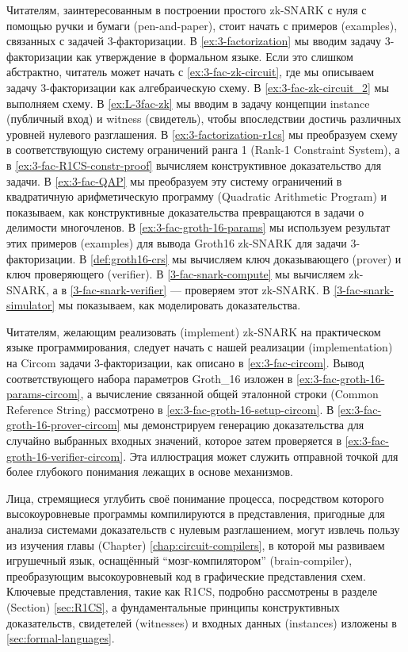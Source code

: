 Читателям, заинтересованным в построении простого zk-SNARK с нуля с помощью ручки и бумаги (pen-and-paper), стоит начать с примеров (examples), связанных с задачей 3-факторизации. В \examplename{} \ref{ex:3-factorization} мы вводим задачу 3-факторизации как утверждение в формальном языке. Если это слишком абстрактно, читатель может начать с \examplename{} \ref{ex:3-fac-zk-circuit}, где мы описываем задачу 3-факторизации как алгебраическую схему. В \examplename{} \ref{ex:3-fac-zk-circuit_2} мы выполняем схему. В \examplename{} \ref{ex:L-3fac-zk} мы вводим в задачу концепции instance (публичный вход) и witness (свидетель), чтобы впоследствии достичь различных уровней нулевого разглашения. В \examplename{} \ref{ex:3-factorization-r1cs} мы преобразуем схему в соответствующую систему ограничений ранга 1 (Rank-1 Constraint System), а в \examplename{} \ref{ex:3-fac-R1CS-constr-proof} вычисляем конструктивное доказательство для задачи. В \examplename{} \ref{ex:3-fac-QAP} мы преобразуем эту систему ограничений в квадратичную арифметическую программу (Quadratic Arithmetic Program) и показываем, как конструктивные доказательства превращаются в задачи о делимости многочленов. В \examplename{} \ref{ex:3-fac-groth-16-params} мы используем результат этих примеров (examples) для вывода Groth16 zk-SNARK для задачи 3-факторизации. В \ref{def:groth16-crs} мы вычисляем ключ доказывающего (prover) и ключ проверяющего (verifier). В \examplename{} \ref{3-fac-snark-compute} мы вычисляем zk-SNARK, а в \examplename{} \ref{3-fac-snark-verifier} — проверяем этот zk-SNARK. В \examplename{} \ref{3-fac-snark-simulator} мы показываем, как моделировать доказательства. 

Читателям, желающим реализовать (implement) zk-SNARK на практическом языке программирования, следует начать с нашей реализации (implementation) на Circom задачи 3-факторизации, как описано в \ref{ex:3-fac-circom}. Вывод соответствующего набора параметров Groth\_16 изложен в \ref{ex:3-fac-groth-16-params-circom}, а вычисление связанной общей эталонной строки (Common Reference String) рассмотрено в \ref{ex:3-fac-groth-16-setup-circom}. В \ref{ex:3-fac-groth-16-prover-circom} мы демонстрируем генерацию доказательства для случайно выбранных входных значений, которое затем проверяется в \ref{ex:3-fac-groth-16-verifier-circom}. Эта иллюстрация может служить отправной точкой для более глубокого понимания лежащих в основе механизмов.

Лица, стремящиеся углубить своё понимание процесса, посредством которого высокоуровневые программы компилируются в представления, пригодные для анализа системами доказательств с нулевым разглашением, могут извлечь пользу из изучения главы (Chapter) \ref{chap:circuit-compilers}, в которой мы развиваем игрушечный язык, оснащённый ``мозг-компилятором'' (brain-compiler), преобразующим высокоуровневый код в графические представления схем. Ключевые представления, такие как R1CS, подробно рассмотрены в разделе (Section) \ref{sec:R1CS}, а фундаментальные принципы конструктивных доказательств, свидетелей (witnesses) и входных данных (instances) изложены в \ref{sec:formal-languages}.



